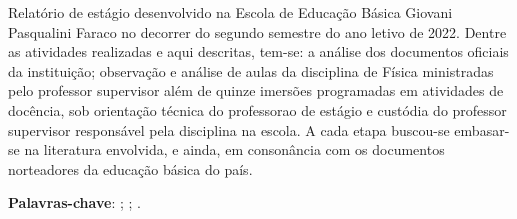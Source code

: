 \setlength{\absparsep}{18pt} %
\begin{resumo}
    Relatório de estágio desenvolvido na Escola de Educação Básica Giovani Pasqualini Faraco no decorrer do segundo semestre do ano letivo de 2022. Dentre as atividades realizadas e aqui descritas, tem-se: a análise dos documentos oficiais da instituição; observação e análise de aulas da disciplina de Física ministradas pelo professor supervisor além de quinze imersões programadas em atividades de docência, sob orientação técnica do professorao de estágio e custódia do professor supervisor responsável pela disciplina na escola. A cada etapa buscou-se embasar-se na literatura envolvida, e ainda, em consonância com os documentos norteadores da educação básica do país.

\textbf{Palavras-chave}: \firstkey ; \secondkey ; \thirdkey.
\end{resumo}